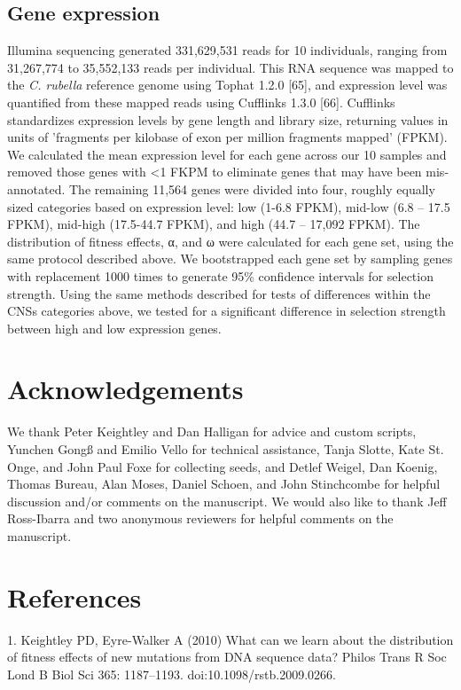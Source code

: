 \subsection{Gene expression}
	Illumina sequencing generated 331,629,531 reads for 10 individuals, ranging from 31,267,774 to 35,552,133 reads per individual. This RNA sequence was mapped to the \textit{C. rubella} reference genome using Tophat 1.2.0 [65], and expression level was quantified from these mapped reads using Cufflinks 1.3.0 [66]. Cufflinks standardizes expression levels by gene length and library size, returning values in units of 'fragments per kilobase of exon per million fragments mapped' (FPKM). We calculated the mean expression level for each gene across our 10 samples and removed those genes with <1 FKPM to eliminate genes that may have been mis-annotated. The remaining 11,564 genes were divided into four, roughly equally sized categories based on expression level: low (1-6.8 FPKM), mid-low (6.8 – 17.5 FPKM), mid-high (17.5-44.7 FPKM), and high (44.7 – 17,092 FPKM). The distribution of fitness effects, α, and ω were calculated for each gene set, using the same protocol described above. We bootstrapped each gene set by sampling genes with replacement 1000 times to generate 95\% confidence intervals for selection strength. Using the same methods described for tests of differences within the CNSs categories above, we tested for a significant difference in selection strength between high and low expression genes.

\section{Acknowledgements}
We thank Peter Keightley and Dan Halligan for advice and custom scripts, Yunchen Gongß and Emilio Vello for technical assistance, Tanja Slotte, Kate St. Onge, and John Paul Foxe for collecting seeds, and Detlef Weigel, Dan Koenig, Thomas Bureau, Alan Moses, Daniel Schoen, and John Stinchcombe for helpful discussion and/or comments on the manuscript. We would also like to thank Jeff Ross-Ibarra and two anonymous reviewers for helpful comments on the manuscript.

\section{References}


1.	Keightley PD, Eyre-Walker A (2010) What can we learn about the distribution of fitness effects of new mutations from DNA sequence data? Philos Trans R Soc Lond B Biol Sci 365: 1187–1193. doi:10.1098/rstb.2009.0266.

